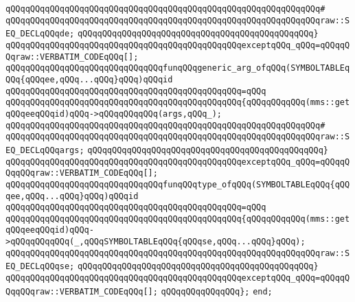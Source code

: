 \verb|qQQqqQQqqQQqqQQqqQQqqQQqqQQqqQQqqQQqqQQqqQQqqQQqqQQqqQQqqQQqqQQq#|\newline
\verb|qQQqqQQqqQQqqQQqqQQqqQQqqQQqqQQqqQQqqQQqqQQqqQQqqQQqqQQqqQQqqQQqraw::SEQ_DECLqQQqde;|\newline
\verb|qQQqqQQqqQQqqQQqqQQqqQQqqQQqqQQqqQQqqQQqqQQqqQQq}|\newline
\verb|qQQqqQQqqQQqqQQqqQQqqQQqqQQqqQQqqQQqqQQqqQQqqQQqexceptqQQq_qQQq=qQQqqQQqraw::VERBATIM_CODEqQQq[];|\newline
\newline
\newline
\verb|qQQqqQQqqQQqqQQqqQQqqQQqqQQqqQQqfunqQQqgeneric_arg_ofqQQq(SYMBOLTABLEqQQq{qQQqee,qQQq...qQQq}qQQq)qQQqid|\newline
\verb|qQQqqQQqqQQqqQQqqQQqqQQqqQQqqQQqqQQqqQQqqQQqqQQq=qQQq|\newline
\verb|qQQqqQQqqQQqqQQqqQQqqQQqqQQqqQQqqQQqqQQqqQQqqQQq{qQQqqQQqqQQq(mms::getqQQqeeqQQqid)qQQq->qQQqqQQqqQQq(args,qQQq_);|\newline
\verb|qQQqqQQqqQQqqQQqqQQqqQQqqQQqqQQqqQQqqQQqqQQqqQQqqQQqqQQqqQQqqQQq#|\newline
\verb|qQQqqQQqqQQqqQQqqQQqqQQqqQQqqQQqqQQqqQQqqQQqqQQqqQQqqQQqqQQqqQQqraw::SEQ_DECLqQQqargs;|\newline
\verb|qQQqqQQqqQQqqQQqqQQqqQQqqQQqqQQqqQQqqQQqqQQqqQQq}|\newline
\verb|qQQqqQQqqQQqqQQqqQQqqQQqqQQqqQQqqQQqqQQqqQQqqQQqexceptqQQq_qQQq=qQQqqQQqqQQqraw::VERBATIM_CODEqQQq[];|\newline
\newline
\newline
\verb|qQQqqQQqqQQqqQQqqQQqqQQqqQQqqQQqfunqQQqtype_ofqQQq(SYMBOLTABLEqQQq{qQQqee,qQQq...qQQq}qQQq)qQQqid|\newline
\verb|qQQqqQQqqQQqqQQqqQQqqQQqqQQqqQQqqQQqqQQqqQQqqQQq=qQQq|\newline
\verb|qQQqqQQqqQQqqQQqqQQqqQQqqQQqqQQqqQQqqQQqqQQqqQQq{qQQqqQQqqQQq(mms::getqQQqeeqQQqid)qQQq->qQQqqQQqqQQq(_,qQQqSYMBOLTABLEqQQq{qQQqse,qQQq...qQQq}qQQq);|\newline
\verb|qQQqqQQqqQQqqQQqqQQqqQQqqQQqqQQqqQQqqQQqqQQqqQQqqQQqqQQqqQQqqQQqraw::SEQ_DECLqQQqse;|\newline
\verb|qQQqqQQqqQQqqQQqqQQqqQQqqQQqqQQqqQQqqQQqqQQqqQQq}|\newline
\verb|qQQqqQQqqQQqqQQqqQQqqQQqqQQqqQQqqQQqqQQqqQQqqQQqexceptqQQq_qQQq=qQQqqQQqqQQqraw::VERBATIM_CODEqQQq[];|\newline
\verb|qQQqqQQqqQQqqQQq};|\newline
\verb|end;|\newline

